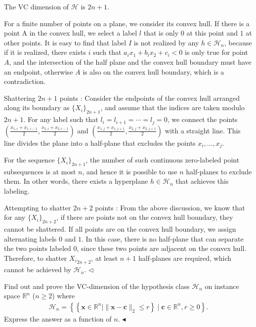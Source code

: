 \documentclass[11pt]{article}
\newenvironment{problem}[2][Problem]{\begin{trivlist}
\item[\hskip \labelsep {\bfseries #1}\hskip \labelsep {\bfseries #2.}]}{\hfill$\blacktriangleleft$\end{trivlist}}
\newenvironment{answer}[1][Answer]{\begin{trivlist}
\item[\hskip \labelsep {\bfseries #1.}\hskip \labelsep]}{\hfill$\lhd$\end{trivlist}}
\begin{document}
\begin{answer}
    The VC dimension of $\mathcal{H}$ is $2n+1$.
    
    For a finite number of points on a plane, we consider its convex hull. If there is a point A in the convex hull, we select a label $l$ that is only $0$ at this point and $1$ at other points. It is easy to find that label $I$ is not realized by any $h\in \mathcal H_n$, because if it is realized, there exists $i$ such that $a_i x_1 +b_i x_2 + c_i < 0 $ is only true for point $A$, and the intersection of the half plane and the convex hull boundary must have an endpoint, otherwise $A$ is also on the convex hull boundary, which is a contradiction.

    Shattering $2n+1$ points : Consider the endpoints of the convex hull arranged along its boundary as $\{X_i\}_{2n+1}$, and assume that the indices are taken modulo $2n+1$. For any label such that $l_i = l_{i+1} = \cdots = l_j = 0$, we connect the points $(\frac{x_{1,i} + x_{1,i-1}}{2}, \frac{x_{2,i} + x_{2,i-1}}{2})$ and $(\frac{x_{1,j} + x_{1,j+1}}{2}, \frac{x_{2,j} + x_{2,j+1}}{2})$ with a straight line. This line divides the plane into a half-plane that excludes the points $x_i, \dots, x_j$. 

    For the sequence $\{X_i\}_{2n+1}$, the number of such continuous zero-labeled point subsequences is at most $n$, and hence it is possible to use $n$ half-planes to exclude them. In other words, there exists a hyperplane $h \in \mathcal{H}_n$ that achieves this labeling.

    Attempting to shatter $2n+2$ points : From the above discussion, we know that for any $\{X_i\}_{2n+2}$, if there are points not on the convex hull boundary, they cannot be shattered. If all points are on the convex hull boundary, we assign alternating labels $0$ and $1$. In this case, there is no half-plane that can separate the two points labeled $0$, since these two points are adjacent on the convex hull. Therefore, to shatter ${X_i}_{2n+2}$, at least $n+1$ half-planes are required, which cannot be achieved by $\mathcal{H}_n$.
\end{answer}

\begin{problem}{4 (16')}
Find out and prove the VC-dimension of the hypothesis class $\mathcal{H}_n$ on instance space $\mathbb{R}^n$ ($n\geq 2$) where
\begin{align*}
\mathcal{H}_n=\left\{\left\{\bm x\in\mathbb{R}^n\mid \|\bm x-\bm c\|_2\leq r\right\}\mid \bm c\in\mathbb{R}^n, r\geq 0\right\}.
\end{align*}
Express the answer as a function of $n$.
\end{problem}
\end{document}
